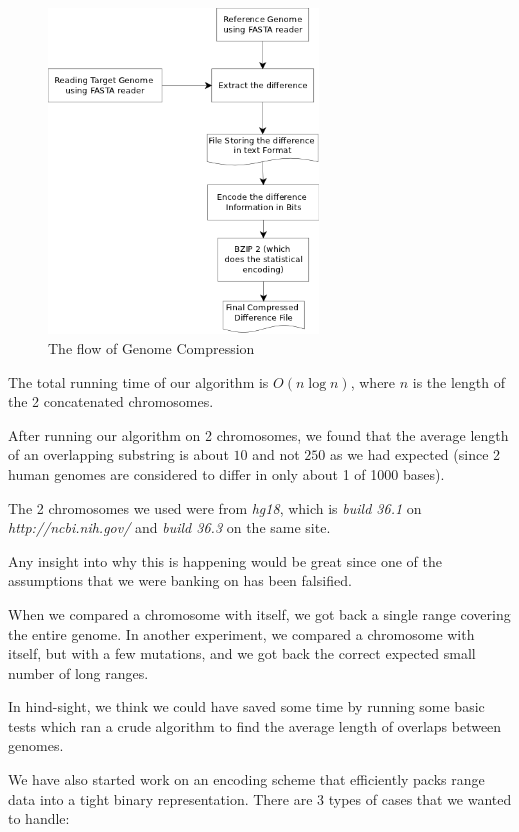 \documentclass[11pt,twocolumn]{article}
\begin{document}
\begin{figure}
  \begin{center}
    \includegraphics[height=3.4in]{figures/GenomeCompressionFlow.png}
    \caption{The flow of Genome Compression}
    \label{fig:genomecompressionflow}
  \end{center}
\end {figure}

The total running time of our algorithm is $O(n\log{n})$, where $n$ is
the length of the 2 concatenated chromosomes.

After running our algorithm on 2 chromosomes, we found that the
average length of an overlapping substring is about $10$ and not $250$
as we had expected (since 2 human genomes are considered to differ in
only about 1 of 1000 bases).

The 2 chromosomes we used were from \textit{hg18}, which is
\textit{build 36.1} on \textit{http://ncbi.nih.gov/} and \textit{build
  36.3} on the same site.

Any insight into why this is happening would be great since one of the
assumptions that we were banking on has been falsified.

When we compared a chromosome with itself, we got back a single range
covering the entire genome. In another experiment, we compared a
chromosome with itself, but with a few mutations, and we got back the
correct expected small number of long ranges.

In hind-sight, we think we could have saved some time by running some
basic tests which ran a crude algorithm to find the average length of
overlaps between genomes.

We have also started work on an encoding scheme that efficiently packs
range data into a tight binary representation. There are 3 types of
cases that we wanted to handle:
\end{document}
